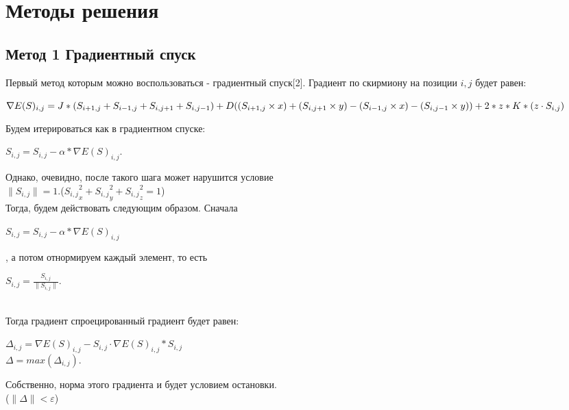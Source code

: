 \documentclass[ 12pt,x11names]{article}
\begin{document}
    \section{Методы решения}
    \subsection{Метод 1 Градиентный спуск}
    Первый метод которым можно воспользоваться  - градиентный спуск[2]. Градиент по скирмиону на позиции $i, j$ будет равен:
      \begin{center}
    $\nabla E(S)_{i, j} = J * (S_{i + 1,j} + S_{i - 1,j} + S_{i, j + 1} + S_{i, j - 1})
        + \\ D  ( (S_{i + 1,j} \times x) + (S_{i, j + 1} \times y) -  (S_{i - 1, j} \times x) - (S_{i, j - 1} \times y) )\\
        + 2 * z * K * (z \cdot S_{i, j})$\\
          \end{center}
    Будем  итерироваться как в градиентном спуске:
    \begin{center}
    $S_{i, j} = S_{i, j} - \alpha * \nabla E(S)_{i, j}$.\\
    \end{center}
    Однако, очевидно, после такого шага может  нарушится условие\\ $\|S_{i, j}\| = 1$.(${S_{i,j}}_x^2 + {S_{i,j}}_y^2 + {S_{i,j}}_z^2 = 1$)\\
    Тогда, будем действовать следующим образом. Сначала \\
    \begin{center}
    $S_{i, j} = S_{i, j} - \alpha * \nabla E(S)_{i, j}$
    \end{center}, а потом отнормируем каждый элемент, то есть \begin{center}$S_{i, j} = \frac{S_{i, j}}{\|S_{i, j}\|}$.\end{center}\\
    Тогда градиент спроецированный градиент будет равен:\\
    \begin{center}
    $\Delta_{i, j} = \nabla E(S)_{i, j} - S_{i, j} \cdot \nabla E(S)_{i, j} * S_{i, j}$\\
    $\Delta = max(\Delta_{i, j}).$\\
    \end{center}
    Собственно, норма этого градиента и будет условием остановки.\\
    ($\| \Delta \|< \varepsilon$)\\
\end{document}
